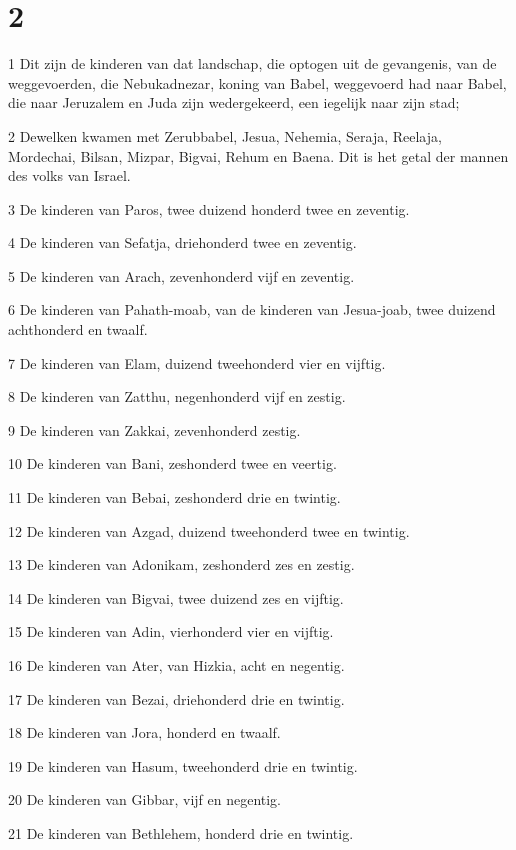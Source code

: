 \chapter{2}

\par 1 Dit zijn de kinderen van dat landschap, die optogen uit de gevangenis, van de weggevoerden, die Nebukadnezar, koning van Babel, weggevoerd had naar Babel, die naar Jeruzalem en Juda zijn wedergekeerd, een iegelijk naar zijn stad;
\par 2 Dewelken kwamen met Zerubbabel, Jesua, Nehemia, Seraja, Reelaja, Mordechai, Bilsan, Mizpar, Bigvai, Rehum en Baena. Dit is het getal der mannen des volks van Israel.
\par 3 De kinderen van Paros, twee duizend honderd twee en zeventig.
\par 4 De kinderen van Sefatja, driehonderd twee en zeventig.
\par 5 De kinderen van Arach, zevenhonderd vijf en zeventig.
\par 6 De kinderen van Pahath-moab, van de kinderen van Jesua-joab, twee duizend achthonderd en twaalf.
\par 7 De kinderen van Elam, duizend tweehonderd vier en vijftig.
\par 8 De kinderen van Zatthu, negenhonderd vijf en zestig.
\par 9 De kinderen van Zakkai, zevenhonderd zestig.
\par 10 De kinderen van Bani, zeshonderd twee en veertig.
\par 11 De kinderen van Bebai, zeshonderd drie en twintig.
\par 12 De kinderen van Azgad, duizend tweehonderd twee en twintig.
\par 13 De kinderen van Adonikam, zeshonderd zes en zestig.
\par 14 De kinderen van Bigvai, twee duizend zes en vijftig.
\par 15 De kinderen van Adin, vierhonderd vier en vijftig.
\par 16 De kinderen van Ater, van Hizkia, acht en negentig.
\par 17 De kinderen van Bezai, driehonderd drie en twintig.
\par 18 De kinderen van Jora, honderd en twaalf.
\par 19 De kinderen van Hasum, tweehonderd drie en twintig.
\par 20 De kinderen van Gibbar, vijf en negentig.
\par 21 De kinderen van Bethlehem, honderd drie en twintig.
